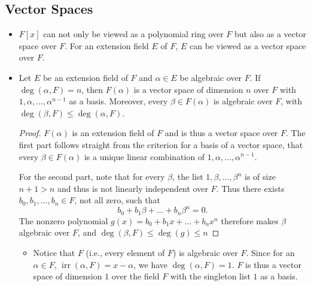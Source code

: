 \documentclass[11pt]{article}
\newcommand{\irr}{\operatorname{irr}}
\begin{document}
\subsection{Vector Spaces}
\begin{itemize}
    \item $F[x]$ can not only be viewed as a polynomial ring over $F$ but also as a vector space over $F$. For an extension field $E$ of $F$, $E$ can be viewed as a vector space over $F$.
    \item Let $E$ be an extension field of $F$ and $\alpha \in E$ be algebraic over $F$. If $\deg(\alpha,F) = n$, then $F(\alpha)$ is a vector space of dimension $n$ over $F$ with $1,\alpha,\dots,\alpha^{n-1}$ as a basis. Moreover, every $\beta \in F(\alpha)$ is algebraic over $F$, with $\deg(\beta,F) \leq \deg(\alpha,F)$.
    
    \begin{proof}
        $F(\alpha)$ is an extension field of $F$ and is thus a vector space over $F$. The first part follows straight from the criterion for a basis of a vector space, that every $\beta \in F(\alpha)$ is a unique linear combination of $1,\alpha,\dots,\alpha^{n-1}$.
        
        For the second part, note that for every $\beta$, the list $1,\beta,\dots,\beta^n$ is of size $n+1 > n$ and thus is not linearly independent over $F$. Thus there exists $b_0, b_1, \dots, b_n \in F$, not all zero, such that \[b_0 + b_1 \beta + \dots + b_n \beta^n = 0.\] The nonzero polynomial $g(x) = b_0 + b_1 x+\dots+b_n x^n$ therefore makes $\beta$ algebraic over $F$, and $\deg(\beta,F) \leq \deg(g) \leq n$
    \end{proof}
    \begin{itemize}
        \item Notice that $F$ (i.e., every element of $F$) is algebraic over $F$. Since for an $\alpha \in F$, $\irr(\alpha,F) = x - \alpha$, we have $\deg(\alpha,F) = 1$. $F$ is thus a vector space of dimension $1$ over the field $F$ with the singleton list $1$ as a basis.
    \end{itemize}
\end{itemize}
\end{document}
